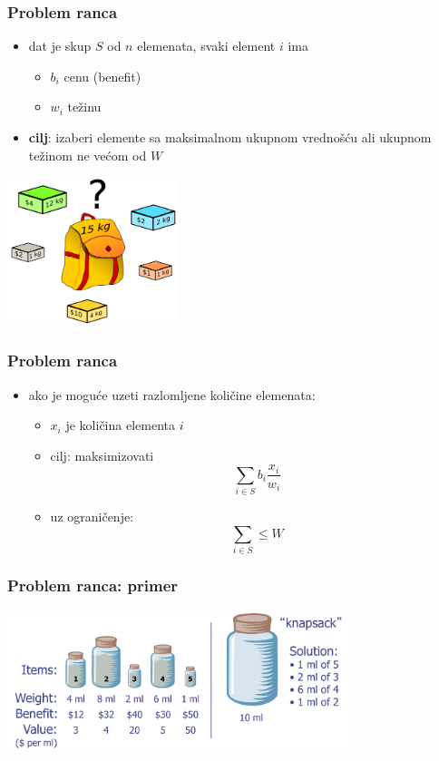 \documentclass[compress]{beamer}
\begin{document}
\begin{frame}[fragile]
  \frametitle{Problem ranca}
  \begin{itemize}
    \item dat je skup $S$ od $n$ elemenata, svaki element $i$ ima
    \begin{itemize}
      \item $b_{i}$ cenu (benefit)
      \item $w_{i}$ težinu
    \end{itemize}
    \item \textbf{cilj}: izaberi elemente sa maksimalnom ukupnom 
    vrednošću ali ukupnom težinom ne većom od $W$
  \end{itemize}
  \begin{center}
    \includegraphics[width=5cm]{asp-13-pic28.png}
  \end{center}
\end{frame}

\begin{frame}[fragile]
  \frametitle{Problem ranca}
  \begin{itemize}
    \item ako je moguće uzeti razlomljene količine elemenata:
    \begin{itemize}
      \item $x_{i}$ je količina elementa $i$
      \item cilj: maksimizovati
      $$ \sum_{i\in S}b_{i}\frac{x_{i}}{w_{i}}$$
      \item uz ograničenje:
      $$ \sum_{i\in S} \leq W$$
    \end{itemize}
  \end{itemize}
\end{frame}

\begin{frame}[fragile]
  \frametitle{Problem ranca: primer}
  \begin{center}
    \includegraphics[width=10cm]{asp-13-pic16.png}
  \end{center}
\end{frame}
\end{document}
